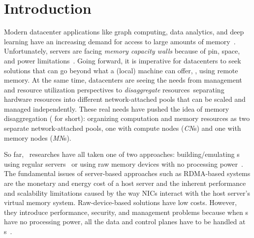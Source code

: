 \section{Introduction}
\label{sec:introduction}

Modern datacenter applications like graph computing, data analytics, and deep learning have an increasing demand for access to large amounts of memory~\cite{FastSwap}.
Unfortunately, servers are facing {\em memory capacity walls} because of pin, space, and power limitations~\cite{HP-MemoryEvol,ITRS14,MemoryWall95}.
Going forward, it is imperative for datacenters to seek solutions that can go beyond what a (local) machine can offer, \ie, using remote memory.
At the same time, datacenters are seeing the needs from management and resource utilization perspectives
to {\em disaggregate} resources~\cite{Ali-SinglesDay,SnowFlake-NSDI20,FB1}\textemdash separating hardware resources into different network-attached pools 
that can be scaled and managed independently.
These real needs have pushed the idea of memory disaggregation ({\em \md} for short):
organizing computation and memory resources as two separate network-attached
pools, one with compute nodes ({\em CN}s) and one with memory nodes ({\em MN}s).

So far, \md\ researches have all taken one of two approaches: 
building/emulating \MN{}s using regular servers~\cite{AIFM,InfiniSwap,FastSwap,Shan18-OSDI,zombieland} 
or using raw memory devices with no processing power~\cite{Tsai20-ATC,Lim09-disaggregate,Lim12-HPCA,HP-TheMachine}.
The fundamental issues of server-based approaches such as RDMA-based systems are the monetary and energy cost of a host server and the inherent performance and scalability limitations caused by the way NICs interact with the host server's virtual memory system.
Raw-device-based solutions have low costs.
However, they introduce performance, security, and management problems
because when \MN{}s have no processing power, all the data and control planes have to be handled at \CN{}s~\cite{Tsai20-ATC}.

